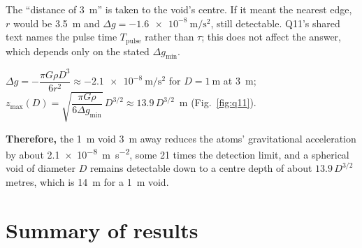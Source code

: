 \documentclass[11pt]{article}
\newcommand{\closing}[1]{\par\medskip\noindent\textbf{Therefore,} #1}
\begin{document}
\begin{notebox}
The ``distance of \SI{3}{\metre}'' is taken to the void's centre. If it meant the nearest edge, $r$
would be \SI{3.5}{\metre} and $\Delta g = \SI{-1.6e-8}{\metre\per\second\squared}$, still detectable.
Q11's shared text names the pulse time $T_{\mathrm{pulse}}$ rather than $\tau$; this does not affect
the answer, which depends only on the stated $\Delta g_{\min}$.
\end{notebox}

\begin{answerbox}
$\Delta g = -\dfrac{\pi G\rho D^3}{6r^2} \approx \SI{-2.1e-8}{\metre\per\second\squared}$ for
$D=\SI{1}{\metre}$ at \SI{3}{\metre}; \quad
$z_{\max}(D) = \sqrt{\dfrac{\pi G\rho}{6\Delta g_{\min}}}\,D^{3/2} \approx 13.9\,D^{3/2}$~m
(Fig.~\ref{fig:q11}).
\closing{the \SI{1}{\metre} void \SI{3}{\metre} away reduces the atoms' gravitational acceleration by
about \SI{2.1e-8}{\metre\per\second\squared}, some 21 times the detection limit, and a spherical void
of diameter $D$ remains detectable down to a centre depth of about $13.9\,D^{3/2}$ metres, which is
\SI{14}{\metre} for a \SI{1}{\metre} void.}
\end{answerbox}

\section{Summary of results}
\end{document}
